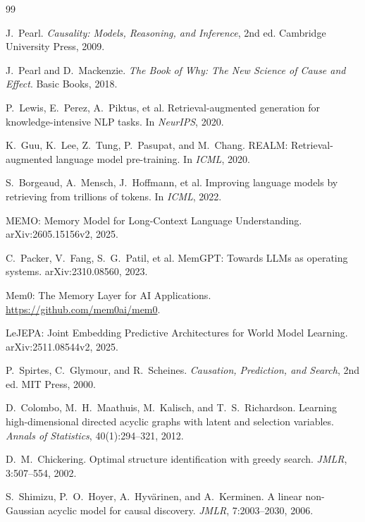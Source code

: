 \documentclass[11pt,a4paper]{article}
\begin{document}

\begin{thebibliography}{99}

J.~Pearl.
\newblock \textit{Causality: Models, Reasoning, and Inference}, 2nd ed.
\newblock Cambridge University Press, 2009.

J.~Pearl and D.~Mackenzie.
\newblock \textit{The Book of Why: The New Science of Cause and Effect}.
\newblock Basic Books, 2018.

P.~Lewis, E.~Perez, A.~Piktus, et al.
\newblock Retrieval-augmented generation for knowledge-intensive NLP tasks.
\newblock In \textit{NeurIPS}, 2020.

K.~Guu, K.~Lee, Z.~Tung, P.~Pasupat, and M.~Chang.
\newblock REALM: Retrieval-augmented language model pre-training.
\newblock In \textit{ICML}, 2020.

S.~Borgeaud, A.~Mensch, J.~Hoffmann, et al.
\newblock Improving language models by retrieving from trillions of tokens.
\newblock In \textit{ICML}, 2022.

MEMO: Memory Model for Long-Context Language Understanding.
\newblock arXiv:2605.15156v2, 2025.

C.~Packer, V.~Fang, S.~G.~Patil, et al.
\newblock MemGPT: Towards LLMs as operating systems.
\newblock arXiv:2310.08560, 2023.

Mem0: The Memory Layer for AI Applications.
\newblock \url{https://github.com/mem0ai/mem0}.

LeJEPA: Joint Embedding Predictive Architectures for World Model Learning.
\newblock arXiv:2511.08544v2, 2025.

P.~Spirtes, C.~Glymour, and R.~Scheines.
\newblock \textit{Causation, Prediction, and Search}, 2nd ed.
\newblock MIT Press, 2000.

D.~Colombo, M.~H.~Maathuis, M.~Kalisch, and T.~S.~Richardson.
\newblock Learning high-dimensional directed acyclic graphs with latent and selection variables.
\newblock \textit{Annals of Statistics}, 40(1):294--321, 2012.

D.~M.~Chickering.
\newblock Optimal structure identification with greedy search.
\newblock \textit{JMLR}, 3:507--554, 2002.

S.~Shimizu, P.~O.~Hoyer, A.~Hyv\"{a}rinen, and A.~Kerminen.
\newblock A linear non-Gaussian acyclic model for causal discovery.
\newblock \textit{JMLR}, 7:2003--2030, 2006.


\end{thebibliography}
\end{document}
